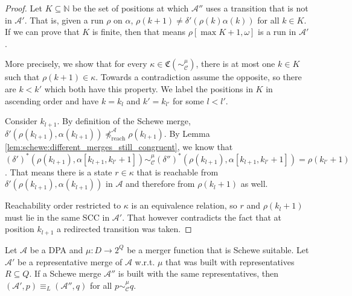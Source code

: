 \begin{proof}
	Let $K \subseteq \mathbb{N}$ be the set of positions at which $\mathcal{A}''$ uses a transition that is not in $\mathcal{A}'$. That is, given a run $\rho$ on $\alpha$, $\rho(k+1) \neq \delta'(\rho(k) \alpha(k))$ for all $k \in K$. If we can prove that $K$ is finite, then that means $\rho[\max K + 1, \omega]$ is a run in $\mathcal{A}'$.
	
	More precisely, we show that for every $\kappa \in \mathfrak{C}(\sim_\mathcal{C}^\mu)$, there is at most one $k \in K$ such that $\rho(k+1) \in \kappa$. Towards a contradiction assume the opposite, so there are $k < k'$ which both have this property. We label the positions in $K$ in ascending order and have $k = k_l$ and $k' = k_{l'}$ for some $l < l'$.
	
	Consider $k_{l+1}$. By definition of the Schewe merge, $\delta'(\rho(k_{l+1}), \alpha(k_{l+1})) \not\preceq_\text{reach}^\mathcal{A} \rho(k_{l+1})$. By Lemma \ref{lem:schewe:different_merges_still_congruent}, we know that $(\delta')^*(\rho(k_{l+1}), \alpha[k_{l+1}, k_{l'}+1]) \sim_\mathcal{C}^\mu (\delta'')^*(\rho(k_{l+1}), \alpha[k_{l+1}, k_{l'}+1]) = \rho(k_{l'}+1)$. That means there is a state $r \in \kappa$ that is reachable from $\delta'(\rho(k_{l+1}), \alpha(k_{l+1}))$ in $\mathcal{A}$ and therefore from $\rho(k_l + 1)$ as well.
	
	Reachability order restricted to $\kappa$ is an equivalence relation, so $r$ and $\rho(k_l + 1)$ must lie in the same SCC in $\mathcal{A}'$. That however contradicts the fact that at position $k_{l+1}$ a redirected transition was taken.
\end{proof}


\begin{lem}
	Let $\mathcal{A}$ be a DPA and $\mu : D \rightarrow 2^Q$ be a merger function that is Schewe suitable. Let $\mathcal{A}'$ be a representative merge of $\mathcal{A}$ w.r.t. $\mu$ that was built with representatives $R \subseteq Q$. If a Schewe merge $\mathcal{A}''$ is built with the same representatives, then $(\mathcal{A}', p) \equiv_L (\mathcal{A}'', q)$ for all $p \sim_\mathcal{C}^\mu q$.
	\label{lem:schewe:schewe_suitable_works}
\end{lem}

